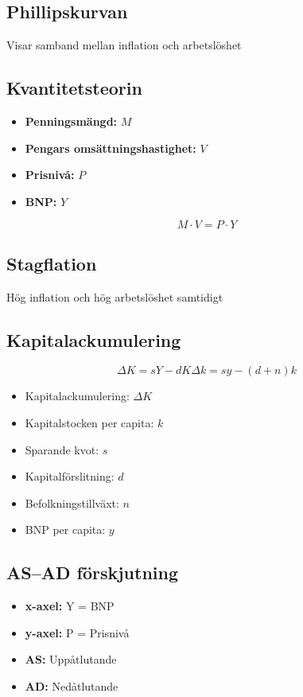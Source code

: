 \documentclass[12pt,a4paper]{article}
\begin{document}
\subsection{Phillipskurvan}
Visar samband mellan inflation och arbetslöshet

\subsection{Kvantitetsteorin}
\begin{itemize}
    \item \textbf{Penningsmängd: }$M$
    \item \textbf{Pengars omsättningshastighet: }$V$
    \item \textbf{Prisnivå: }$P$
    \item \textbf{BNP: }$Y$
\end{itemize}
\[   
M \cdot V = P \cdot Y
\]

\subsection{Stagflation}
Hög inflation och hög arbetslöshet samtidigt

\subsection{Kapitalackumulering}
\[
\Delta K = sY - dK
\Delta k = sy - (d + n)k
\]
\begin{itemize}
    \item Kapitalackumulering: $\Delta K$
    \item Kapitalstocken per capita: $k$
    \item Sparande kvot: $s$
    \item Kapitalförslitning: $d$
    \item Befolkningstillväxt: $n$
    \item BNP per capita: $y$
\end{itemize}

\subsection{AS--AD förskjutning}
\begin{itemize}
    \item \textbf{x-axel: }Y = BNP
    \item \textbf{y-axel: }P = Prisnivå
    \item \textbf{AS: }Uppåtlutande
    \item \textbf{AD: }Nedåtlutande  
\end{itemize}
\end{document}
